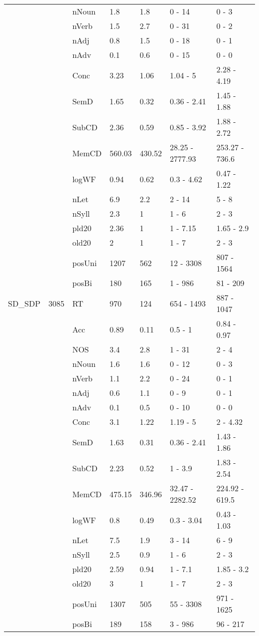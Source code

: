 \begin{table}[ht]
\begin{tabular}{lllllll}
   &  & nNoun & 1.8 & 1.8 & 0 - 14 & 0 - 3 \\ 
   &  & nVerb & 1.5 & 2.7 & 0 - 31 & 0 - 2 \\ 
   &  & nAdj & 0.8 & 1.5 & 0 - 18 & 0 - 1 \\ 
   &  & nAdv & 0.1 & 0.6 & 0 - 15 & 0 - 0 \\ 
   &  & Conc & 3.23 & 1.06 & 1.04 - 5 & 2.28 - 4.19 \\ 
   &  & SemD & 1.65 & 0.32 & 0.36 - 2.41 & 1.45 - 1.88 \\ 
   &  & SubCD & 2.36 & 0.59 & 0.85 - 3.92 & 1.88 - 2.72 \\ 
   &  & MemCD & 560.03 & 430.52 & 28.25 - 2777.93 & 253.27 - 736.6 \\ 
   &  & logWF & 0.94 & 0.62 & 0.3 - 4.62 & 0.47 - 1.22 \\ 
   &  & nLet & 6.9 & 2.2 & 2 - 14 & 5 - 8 \\ 
   &  & nSyll & 2.3 & 1 & 1 - 6 & 2 - 3 \\ 
   &  & pld20 & 2.36 & 1 & 1 - 7.15 & 1.65 - 2.9 \\ 
   &  & old20 & 2 & 1 & 1 - 7 & 2 - 3 \\ 
   &  & posUni & 1207 & 562 & 12 - 3308 & 807 - 1564 \\ 
   &  & posBi & 180 & 165 & 1 - 986 & 81 - 209 \\ 
  SD\_SDP & 3085 & RT & 970 & 124 & 654 - 1493 & 887 - 1047 \\ 
   &  & Acc & 0.89 & 0.11 & 0.5 - 1 & 0.84 - 0.97 \\ 
   &  & NOS & 3.4 & 2.8 & 1 - 31 & 2 - 4 \\ 
   &  & nNoun & 1.6 & 1.6 & 0 - 12 & 0 - 3 \\ 
   &  & nVerb & 1.1 & 2.2 & 0 - 24 & 0 - 1 \\ 
   &  & nAdj & 0.6 & 1.1 & 0 - 9 & 0 - 1 \\ 
   &  & nAdv & 0.1 & 0.5 & 0 - 10 & 0 - 0 \\ 
   &  & Conc & 3.1 & 1.22 & 1.19 - 5 & 2 - 4.32 \\ 
   &  & SemD & 1.63 & 0.31 & 0.36 - 2.41 & 1.43 - 1.86 \\ 
   &  & SubCD & 2.23 & 0.52 & 1 - 3.9 & 1.83 - 2.54 \\ 
   &  & MemCD & 475.15 & 346.96 & 32.47 - 2282.52 & 224.92 - 619.5 \\ 
   &  & logWF & 0.8 & 0.49 & 0.3 - 3.04 & 0.43 - 1.03 \\ 
   &  & nLet & 7.5 & 1.9 & 3 - 14 & 6 - 9 \\ 
   &  & nSyll & 2.5 & 0.9 & 1 - 6 & 2 - 3 \\ 
   &  & pld20 & 2.59 & 0.94 & 1 - 7.1 & 1.85 - 3.2 \\ 
   &  & old20 & 3 & 1 & 1 - 7 & 2 - 3 \\ 
   &  & posUni & 1307 & 505 & 55 - 3308 & 971 - 1625 \\ 
   &  & posBi & 189 & 158 & 3 - 986 & 96 - 217 \\ 
   \hline
\end{tabular}
\endgroup
\end{table}
